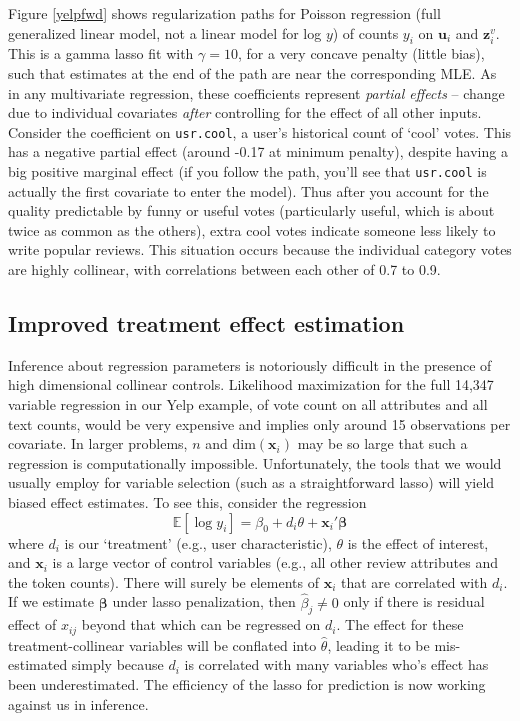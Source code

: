 \documentclass[12pt]{article}
\newcommand{\bs}[1]{\boldsymbol{#1}}
\newcommand{\mr}[1]{\mathrm{#1}}
\newcommand{\bm}[1]{\mathbf{#1}}
\newcommand{\ds}[1]{\mathds{#1}}
\newcommand{\cd}[1]{{\tt#1}}
\begin{document}
 Figure \ref{yelpfwd} shows regularization paths for
Poisson regression (full generalized linear model, not a linear model for
log $y$) of  counts $y_i$ on   $\bm{u}_i$ and
$\bm{z}^v_i$.  This is a gamma lasso fit with $\gamma =10$, for a very concave
penalty (little bias), such that estimates at the end of the path
are near the corresponding MLE.  As in any multivariate regression, these coefficients
represent {\it partial effects} --  change due to
 individual covariates {\it after} controlling for the effect of all other
inputs.  Consider the coefficient on \cd{usr.cool}, a user's historical
count of `cool' votes.  This has a negative partial effect (around -0.17 at
minimum penalty), despite having a big positive marginal effect (if you follow
the path, you'll see that \cd{usr.cool} is actually the first covariate to
enter the model).  Thus after you account for the quality
predictable by funny or useful votes (particularly useful, which is about
twice as common as the others), extra cool votes indicate someone less likely
to write popular reviews.  This situation occurs because the individual
category votes are highly collinear, with correlations between each other of
0.7 to 0.9.

\subsection{Improved treatment effect estimation}

Inference about regression parameters is notoriously difficult in the presence of high dimensional collinear controls.  Likelihood maximization for the full 14,347
variable regression in our Yelp example, of vote count on all attributes and all text counts,  would be very expensive and implies only around 15 observations per covariate.  
In larger problems, $n$ and $\mr{dim}(\bm{x}_i)$ may be so large that such a regression is computationally impossible.
Unfortunately, the tools that we would usually employ for variable selection (such as a straightforward lasso) will yield biased effect estimates.  To see this, consider
the regression 
\begin{equation}\label{teffects}
\ds{E}[\log y_i] = \beta_0 + d_i\theta  + \bm{x}_i'\bs{\beta}
\end{equation}
where $d_i$ is our `treatment' (e.g., user characteristic), $\theta$ is
the effect of interest, and $\bm{x}_i$ is a large vector of control
variables (e.g., all other review attributes and the token counts).   There
will surely be elements of $\bm{x}_i$ that are correlated with $d_i$. If
we estimate $\bs{\beta}$ under lasso penalization, 
then $\hat\beta_j \neq 0$ only if there is 
residual effect of $x_{ij}$ beyond that which can be regressed on $d_i$.  The
 effect for these treatment-collinear variables will be conflated
into $\hat\theta$, leading it to be mis-estimated simply because $d_i$ is correlated with many
variables who's effect has been underestimated.  The efficiency of the lasso
for prediction is now working against us in inference.
\end{document}
